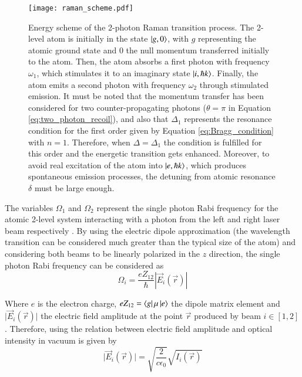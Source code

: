 \begin{figure}[!htbp]\centering
	\texttt{[image: raman\_scheme.pdf]}
	\caption[Energy scheme of the 2-photon Raman transition process]{Energy scheme of the 2-photon Raman transition process. The 2-level atom is initially in the state $\ket{g, 0}$, with $g$ representing the atomic ground state and 0 the null momentum transferred initially to the atom. Then, the atom absorbs a first photon with frequency $\omega_1$, which stimulates it to an imaginary state $\ket{i, \hbar k}$. Finally, the atom emits a second photon with frequency $\omega_2$ through stimulated emission. It must be noted that the momentum transfer has been considered for two counter-propagating photons ($\theta=\pi$ in Equation \eqref{eq:two_photon_recoil}), and also that $\Delta_1$ represents the resonance condition for the first order given by Equation \eqref{eq:Bragg_condition} with $n=1$. Therefore, when $\Delta = \Delta_1$ the condition is fulfilled for this order and the energetic transition gets enhanced. Moreover, to avoid real excitation of the atom into $\ket{e, \hbar k}$, which produces spontaneous emission processes, the detuning from atomic resonance $\delta$ must be large enough. }\label{fig:raman_scheme}
\end{figure}

The variables $\Omega_1$ and $\Omega_2$ represent the single photon Rabi frequency for the atomic 2-level system interacting with a photon from the left and right laser beam respectively \cite{Foot2005}. By using the electric dipole approximation (the wavelength transition can be considered much greater than the typical size of the atom) and considering both beams to be linearly polarized in the $z$ direction, the single photon Rabi frequency can be considered as
\begin{equation}
	\Omega_i = \frac{eZ_{12}}{\hbar} \mathopen|\vec{E}_{i}\mathclose(\vec{r})|
\end{equation} 

Where $e$ is the electron charge, $eZ_{12}=\bra{g}\mu\ket{e}$ the dipole matrix element and $\mathopen|\vec{E}_{i}(\vec{r})\mathclose|$ the electric field amplitude at the point $\vec{r}$ produced by beam $i\in [1,2]$. Therefore, using the relation between electric field amplitude and optical intensity in vacuum is given by
\begin{equation}
	\mathopen|\vec{E}_{i}(\vec{r})\mathclose| = \sqrt{\frac{2}{c \epsilon_0}}\sqrt{I_i(\vec{r})}
\end{equation}

